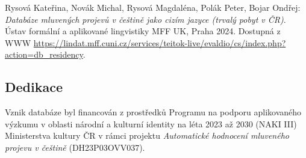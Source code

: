 \documentclass[
]{article}
\begin{document}
Rysová Kateřina, Novák Michal, Rysová Magdaléna, Polák Peter, Bojar
Ondřej: \emph{Databáze mluvených projevů v češtině jako cizím jazyce
(trvalý pobyt v ČR)}. Ústav formální a aplikované lingvistiky MFF UK,
Praha 2024. Dostupná z WWW
\url{https://lindat.mff.cuni.cz/services/teitok-live/evaldio/cs/index.php?action=db_residency}.

\hypertarget{dedikace}{%
\subsection{Dedikace}\label{dedikace}}

Vznik databáze byl financován z prostředků Programu na podporu
aplikovaného výzkumu v oblasti národní a kulturní identity na léta 2023
až 2030 (NAKI III) Ministerstva kultury ČR v rámci projektu
\emph{Automatické hodnocení mluveného projevu v češtině}
(DH23P03OVV037).
\end{document}
